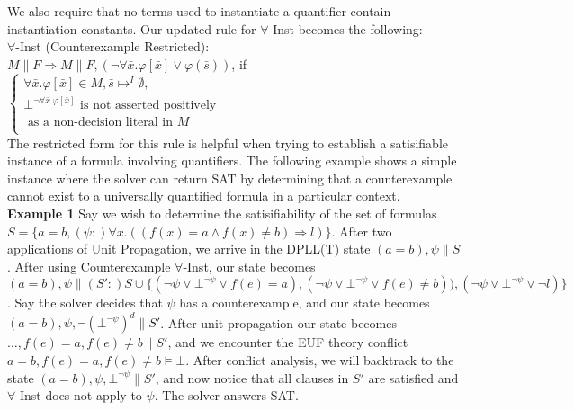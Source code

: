 \documentclass{llncs}
\begin{document}
We also require that no terms used to instantiate a quantifier contain instantiation constants.
Our updated rule for $\forall$-Inst becomes the following: \\

\noindent $\forall$-Inst (Counterexample Restricted): \\

$M \parallel F \Longrightarrow M \parallel F, (\neg \forall \bar{x}. \varphi[ \bar{ x } ] \vee \varphi( \bar{ s } ))$, if   
$\begin{cases}
  \forall \bar{x}. \varphi[ \bar{ x } ] \in M, \bar{ s } \mapsto^I \emptyset, \\
  \bot^{\neg \forall \bar{x}. \varphi[ \bar{ x } ]} \text{ is not asserted positively }\\
  \text{ \ \ \ as a non-decision literal in $M$ } \\    
\end{cases}$ \\

The restricted form for this rule is helpful when trying to establish a satisifiable instance of a formula involving quantifiers.
The following example shows a simple instance where the solver can return SAT by determining that a counterexample cannot exist to a universally quantified formula in a particular context. \\

{\bf Example 1}
Say we wish to determine the satisifiability of the set of formulas $S = \{ a = b, (\psi :) \forall x. ((f(x) = a \wedge f(x) \neq b) \Rightarrow l) \}$.
After two applications of Unit Propagation, we arrive in the DPLL(T) state $( a = b ), \psi \parallel S$.
After using Counterexample $\forall$-Inst, our state becomes $( a = b ), \psi \parallel (S':) S \cup \{ (\neg \psi \vee \bot^{\neg \psi} \vee f( e ) = a), (\neg \psi \vee \bot^{\neg \psi} \vee f( e ) \neq b)), (\neg \psi \vee \bot^{\neg \psi} \vee \neg l) \}$.
Say the solver decides that $\psi$ has a counterexample, and our state becomes $( a = b ), \psi, \neg (\bot^{\neg \psi})^d \parallel S'$. 
After unit propagation our state becomes $\ldots, f( e ) = a, f( e ) \neq b \parallel S'$, and we encounter the EUF theory conflict $a = b, f( e ) = a, f( e ) \neq b \models \bot$.
After conflict analysis, we will backtrack to the state $( a = b ), \psi, \bot^{\neg \psi} \parallel S'$, and now notice that all clauses in $S'$ are satisfied and $\forall$-Inst does not apply to $\psi$.
The solver answers SAT. \\
\end{document}

